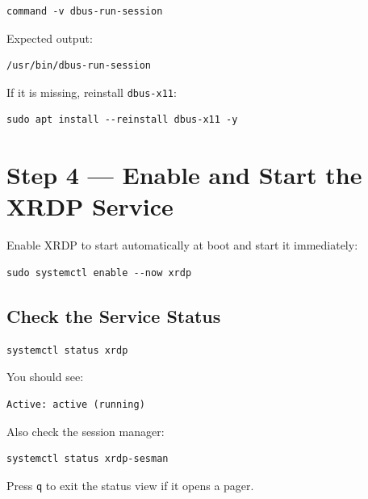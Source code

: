 \documentclass[a4paper,12pt]{article}
\newcommand{\code}[1]{\texttt{\small #1}}
\begin{document}
\begin{lstlisting}[style=bashstyle]
command -v dbus-run-session
\end{lstlisting}

Expected output:

\begin{lstlisting}[style=textstyle]
/usr/bin/dbus-run-session
\end{lstlisting}

If it is missing, reinstall \code{dbus-x11}:

\begin{lstlisting}[style=bashstyle]
sudo apt install --reinstall dbus-x11 -y
\end{lstlisting}

\section{Step 4 --- Enable and Start the XRDP Service}

Enable XRDP to start automatically at boot and start it immediately:

\begin{lstlisting}[style=bashstyle]
sudo systemctl enable --now xrdp
\end{lstlisting}

\subsection{Check the Service Status}

\begin{lstlisting}[style=bashstyle]
systemctl status xrdp
\end{lstlisting}

You should see:

\begin{lstlisting}[style=textstyle]
Active: active (running)
\end{lstlisting}

Also check the session manager:

\begin{lstlisting}[style=bashstyle]
systemctl status xrdp-sesman
\end{lstlisting}

\begin{tipbox}
Press \code{q} to exit the status view if it opens a pager.
\end{tipbox}
\end{document}
